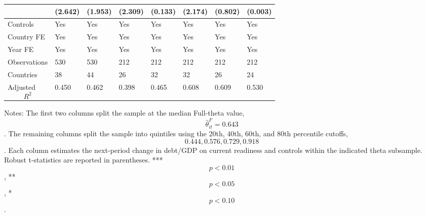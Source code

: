 \begin{table}[H]
\begin{threeparttable}
\begin{tabularx}{\textwidth}{lYYYYYYY}
  & (2.642) & (1.953) & (2.309) & (0.133) & (2.174) & (0.802) & (0.003) \\
\midrule
Controls & Yes & Yes & Yes & Yes & Yes & Yes & Yes \\
Country FE & Yes & Yes & Yes & Yes & Yes & Yes & Yes \\
Year FE & Yes & Yes & Yes & Yes & Yes & Yes & Yes \\
Observations & 530 & 530 & 212 & 212 & 212 & 212 & 212 \\
Countries & 38 & 44 & 26 & 32 & 32 & 26 & 24 \\
Adjusted $$R^2$$ & 0.450 & 0.462 & 0.398 & 0.465 & 0.608 & 0.609 & 0.530 \\
\bottomrule
\end{tabularx}
\begin{tablenotes}[flushleft]\footnotesize
\item Notes: The first two columns split the sample at the median Full-theta value, $$\widehat{\theta}^{F}_{it}=0.643$$. The remaining columns split the sample into quintiles using the 20th, 40th, 60th, and 80th percentile cutoffs, $$0.444, 0.576, 0.729, 0.918$$. Each column estimates the next-period change in debt/GDP on current readiness and controls within the indicated theta subsample. Robust t-statistics are reported in parentheses. *** $$p<0.01$$, ** $$p<0.05$$, * $$p<0.10$$.
\end{tablenotes}
\end{threeparttable}
\end{table}

